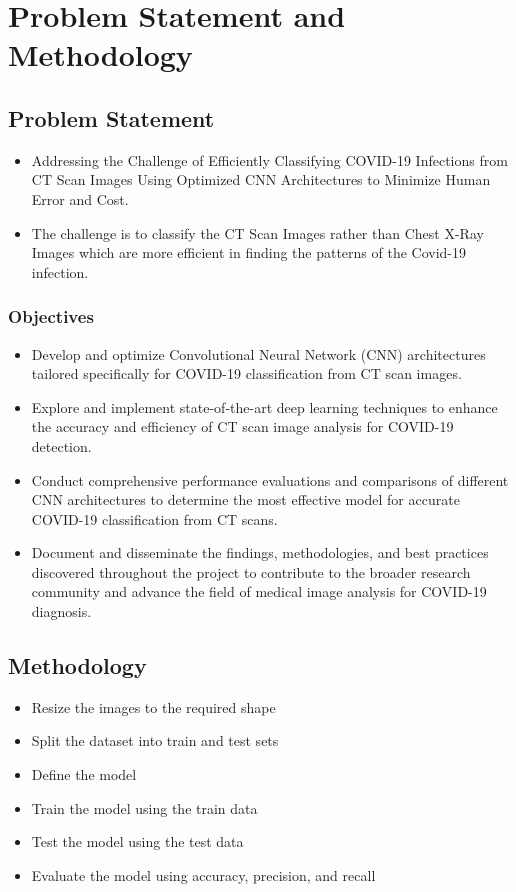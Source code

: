 \documentclass[12pt, a4paper]{report}
\begin{document}
\chapter{Problem Statement and Methodology}
\section{Problem Statement}
\begin{itemize}
    \item \text Addressing the Challenge of Efficiently Classifying COVID-19 Infections from CT Scan Images Using Optimized CNN Architectures to Minimize Human Error and Cost.
    \item \text The challenge is to classify the CT Scan Images rather than Chest X-Ray Images which are more efficient in finding the patterns of the Covid-19 infection.
\end{itemize}

\subsection{Objectives}
\begin{itemize}
    \item \text Develop and optimize Convolutional Neural Network (CNN) architectures tailored specifically for COVID-19 classification from CT scan images.
    \item \text Explore and implement state-of-the-art deep learning techniques to enhance the accuracy and efficiency of CT scan image analysis for COVID-19 detection.
    \item \text Conduct comprehensive performance evaluations and comparisons of different CNN architectures to determine the most effective model for accurate COVID-19 classification from CT scans.
    \item \text Document and disseminate the findings, methodologies, and best practices discovered throughout the project to contribute to the broader research community and advance the field of medical image analysis for COVID-19 diagnosis.
\end{itemize}

\section{Methodology}
\begin{itemize}
    \item \text Resize the images to the required shape
    \item \text Split the dataset into train and test sets
    \item \text Define the model
    \item \text Train the model using the train data
    \item \text Test the model using the test data
    \item \text Evaluate the model using accuracy, precision, and recall
\end{itemize}
\end{document}
